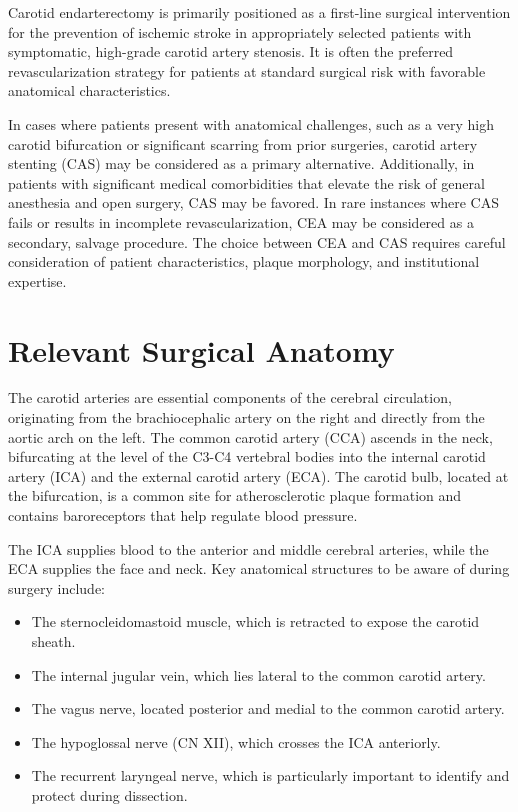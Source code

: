 Carotid endarterectomy is primarily positioned as a first-line surgical intervention for the prevention of ischemic stroke in appropriately selected patients with symptomatic, high-grade carotid artery stenosis. It is often the preferred revascularization strategy for patients at standard surgical risk with favorable anatomical characteristics.

In cases where patients present with anatomical challenges, such as a very high carotid bifurcation or significant scarring from prior surgeries, carotid artery stenting (CAS) may be considered as a primary alternative. Additionally, in patients with significant medical comorbidities that elevate the risk of general anesthesia and open surgery, CAS may be favored. In rare instances where CAS fails or results in incomplete revascularization, CEA may be considered as a secondary, salvage procedure. The choice between CEA and CAS requires careful consideration of patient characteristics, plaque morphology, and institutional expertise.

\section*{Relevant Surgical Anatomy}
The carotid arteries are essential components of the cerebral circulation, originating from the brachiocephalic artery on the right and directly from the aortic arch on the left. The common carotid artery (CCA) ascends in the neck, bifurcating at the level of the C3-C4 vertebral bodies into the internal carotid artery (ICA) and the external carotid artery (ECA). The carotid bulb, located at the bifurcation, is a common site for atherosclerotic plaque formation and contains baroreceptors that help regulate blood pressure.

The ICA supplies blood to the anterior and middle cerebral arteries, while the ECA supplies the face and neck. Key anatomical structures to be aware of during surgery include:

\begin{itemize}
  \item The sternocleidomastoid muscle, which is retracted to expose the carotid sheath.
  \item The internal jugular vein, which lies lateral to the common carotid artery.
  \item The vagus nerve, located posterior and medial to the common carotid artery.
  \item The hypoglossal nerve (CN XII), which crosses the ICA anteriorly.
  \item The recurrent laryngeal nerve, which is particularly important to identify and protect during dissection.
\end{itemize}

